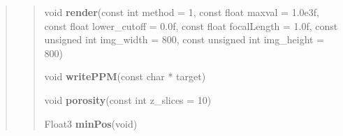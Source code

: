 \documentclass[letterpaper,10pt,english]{sphinxmanual}
\begin{document}
\begin{quote}
\begin{quote}
\begin{quote}






\end{quote}

\label{sphere_internals:project0classDEM_1ab28a7813c5848d3b27e6f1ed5196d649}\label{sphere_internals:project0classDEM_1ab28a7813c5848d3b27e6f1ed5196d649}
\begin{DUlineblock}{0em}
\item[] void \textbf{render}(const int method = 1, const float maxval = 1.0e3f, const float lower\_cutoff = 0.0f, const float focalLength = 1.0f, const unsigned int img\_width = 800, const unsigned int img\_height = 800)
\end{DUlineblock}

\begin{quote}






\end{quote}

\label{sphere_internals:project0classDEM_1a5abc32b3691e7336e80cfab162d0a237}\label{sphere_internals:project0classDEM_1a5abc32b3691e7336e80cfab162d0a237}
\begin{DUlineblock}{0em}
\item[] void \textbf{writePPM}(const char * target)
\end{DUlineblock}

\begin{quote}






\end{quote}

\label{sphere_internals:project0classDEM_1ad4e191a3aa8491ae04f1897ff1f24bde}\label{sphere_internals:project0classDEM_1ad4e191a3aa8491ae04f1897ff1f24bde}
\begin{DUlineblock}{0em}
\item[] void \textbf{porosity}(const int z\_slices = 10)
\end{DUlineblock}

\begin{quote}






\end{quote}

\label{sphere_internals:project0classDEM_1ad686ac121d845e804515bcf7209b9f71}\label{sphere_internals:project0classDEM_1ad686ac121d845e804515bcf7209b9f71}
\begin{DUlineblock}{0em}
\item[] Float3 \textbf{minPos}(void)
\end{DUlineblock}


\end{quote}
\end{quote}
\end{document}
